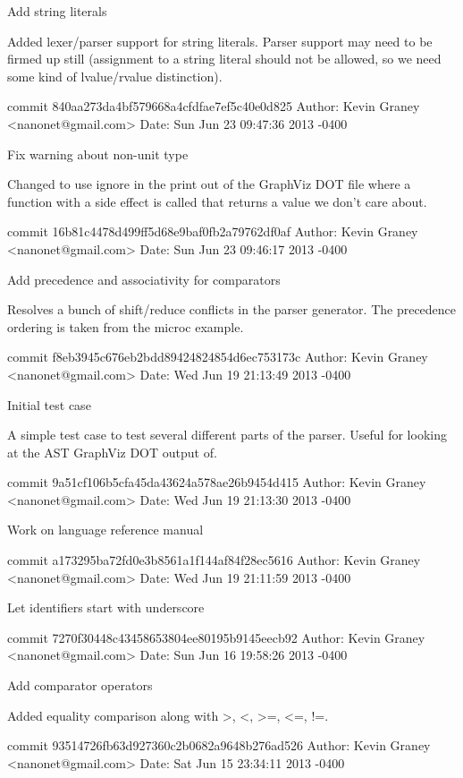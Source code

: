     Add string literals
    
    Added lexer/parser support for string literals. Parser support
    may need to be firmed up still (assignment to a string literal
    should not be allowed, so we need some kind of lvalue/rvalue
    distinction).

commit 840aa273da4bf579668a4cfdfae7ef5c40e0d825
Author: Kevin Graney <nanonet@gmail.com>
Date:   Sun Jun 23 09:47:36 2013 -0400

    Fix warning about non-unit type
    
    Changed to use ignore in the print out of the GraphViz DOT file
    where a function with a side effect is called that returns a value
    we don't care about.

commit 16b81c4478d499ff5d68e9baf0fb2a79762df0af
Author: Kevin Graney <nanonet@gmail.com>
Date:   Sun Jun 23 09:46:17 2013 -0400

    Add precedence and associativity for comparators
    
    Resolves a bunch of shift/reduce conflicts in the parser generator.
    The precedence ordering is taken from the microc example.

commit f8eb3945c676eb2bdd89424824854d6ec753173c
Author: Kevin Graney <nanonet@gmail.com>
Date:   Wed Jun 19 21:13:49 2013 -0400

    Initial test case
    
    A simple test case to test several different parts of the parser.
    Useful for looking at the AST GraphViz DOT output of.

commit 9a51cf106b5cfa45da43624a578ae26b9454d415
Author: Kevin Graney <nanonet@gmail.com>
Date:   Wed Jun 19 21:13:30 2013 -0400

    Work on language reference manual

commit a173295ba72fd0e3b8561a1f144af84f28ec5616
Author: Kevin Graney <nanonet@gmail.com>
Date:   Wed Jun 19 21:11:59 2013 -0400

    Let identifiers start with underscore

commit 7270f30448c43458653804ee80195b9145eecb92
Author: Kevin Graney <nanonet@gmail.com>
Date:   Sun Jun 16 19:58:26 2013 -0400

    Add comparator operators
    
    Added equality comparison along with >, <, >=, <=, !=.

commit 93514726fb63d927360c2b0682a9648b276ad526
Author: Kevin Graney <nanonet@gmail.com>
Date:   Sat Jun 15 23:34:11 2013 -0400


